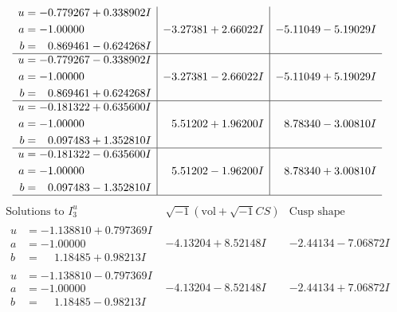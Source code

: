 \documentclass[1p]{elsarticle_modified}
\theoremstyle{definition}
\newcommand{\I}{\sqrt{-1}}
\begin{document}
$$\begin{array}{c|c|c}
\begin{aligned}
u &= -0.779267 + 0.338902 I \\
a &= -1.00000\phantom{ +0.000000I} \\
b &= \phantom{-}0.869461 - 0.624268 I\end{aligned}
 & -3.27381 + 2.66022 I & -5.11049 - 5.19029 I \\ \hline\begin{aligned}
u &= -0.779267 - 0.338902 I \\
a &= -1.00000\phantom{ +0.000000I} \\
b &= \phantom{-}0.869461 + 0.624268 I\end{aligned}
 & -3.27381 - 2.66022 I & -5.11049 + 5.19029 I \\ \hline\begin{aligned}
u &= -0.181322 + 0.635600 I \\
a &= -1.00000\phantom{ +0.000000I} \\
b &= \phantom{-}0.097483 + 1.352810 I\end{aligned}
 & \phantom{-}5.51202 + 1.96200 I & \phantom{-}8.78340 - 3.00810 I \\ \hline\begin{aligned}
u &= -0.181322 - 0.635600 I \\
a &= -1.00000\phantom{ +0.000000I} \\
b &= \phantom{-}0.097483 - 1.352810 I\end{aligned}
 & \phantom{-}5.51202 - 1.96200 I & \phantom{-}8.78340 + 3.00810 I\\
 \hline 
 \end{array}$$\newpage$$\begin{array}{c|c|c}  
\text{Solutions to }I^u_{3}& \I (\text{vol} + \sqrt{-1}CS) & \text{Cusp shape}\\
 \hline 
\begin{aligned}
u &= -1.138810 + 0.797369 I \\
a &= -1.00000\phantom{ +0.000000I} \\
b &= \phantom{-}1.18485 + 0.98213 I\end{aligned}
 & -4.13204 + 8.52148 I & -2.44134 - 7.06872 I \\ \hline\begin{aligned}
u &= -1.138810 - 0.797369 I \\
a &= -1.00000\phantom{ +0.000000I} \\
b &= \phantom{-}1.18485 - 0.98213 I\end{aligned}
 & -4.13204 - 8.52148 I & -2.44134 + 7.06872 I \\ \hline\begin{aligned}

\end{aligned}
\end{array}$$
\end{document}
